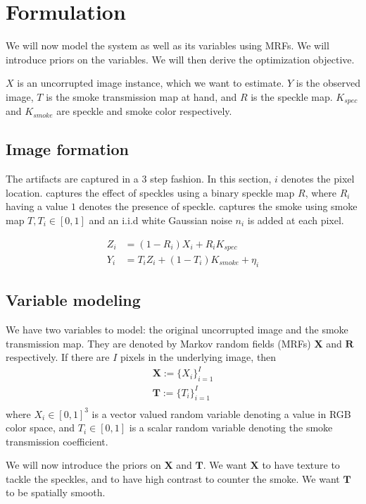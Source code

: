 \chapter{Formulation}

We will now model the system as well as its variables using MRFs. We will introduce priors on the variables. We will then derive the optimization objective.

$X$ is an uncorrupted image instance, which we want to estimate. $Y$ is the observed image, $T$ is the smoke transmission map at hand, and $R$ is the speckle map. $K_{spec}$ and $K_{smoke}$ are speckle and smoke color respectively.

\section{Image formation}
The artifacts are captured in a 3 step fashion. In this section, $i$ denotes the pixel location.  captures the effect of speckles using a binary speckle map $R$, where $R_i$ having a value $1$ denotes the presence of speckle.  captures the smoke using smoke map $T, T_i \in [0, 1]$ and an i.i.d white Gaussian noise $n_i$ is added at each pixel.

\begin{align}
    Z_i &= (1 - R_i) X_i  + R_i K_{spec} \label{eqn:speckle} \\
    Y_i &= T_i Z_i + (1 - T_i) K_{smoke} + \eta_i \label{eqn:smokenoise}
\end{align}

\section{Variable modeling}
We have two variables to model: the original uncorrupted image and the smoke transmission map. They are denoted by Markov random fields (MRFs) $\mathbf{X}$ and $\mathbf{R}$ respectively. If there are $I$ pixels in the underlying image, then
\begin{align}
    \mathbf{X} := \lbrace X_i \rbrace_{i=1}^{I} \\
    \mathbf{T} := \lbrace T_i \rbrace_{i=1}^{I} \\
\end{align}
where $X_i \in [0, 1]^3$ is a vector valued random variable denoting a value in RGB color space, and $T_i \in [0, 1]$ is a scalar random variable denoting the smoke transmission coefficient.

We will now introduce the priors on $\mathbf{X}$ and $\mathbf{T}$. We want $\mathbf{X}$ to have texture to tackle the speckles, and to have high contrast to counter the smoke. We want $\mathbf{T}$ to be spatially smooth.

